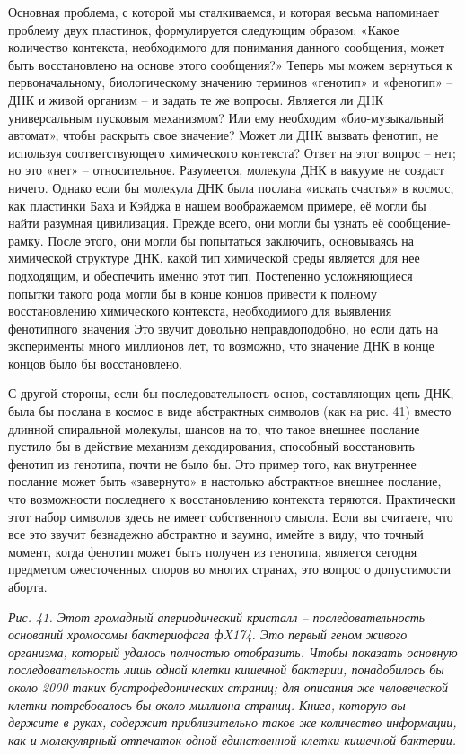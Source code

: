 \documentclass[../main.tex]{subfiles}
\begin{document}
Основная проблема, с которой мы сталкиваемся, и которая весьма напоминает проблему двух пластинок, формулируется следующим образом: «Какое количество контекста, необходимого для понимания данного сообщения, может быть восстановлено на основе этого сообщения?» Теперь мы можем вернуться к первоначальному, биологическому значению терминов «генотип» и «фенотип» \--- ДНК и живой организм \--- и задать те же вопросы. Является ли ДНК универсальным пусковым механизмом? Или ему необходим «био-музыкальный автомат», чтобы раскрыть свое значение? Может ли ДНК вызвать фенотип, не используя соответствующего химического контекста? Ответ на этот вопрос \--- нет; но это «нет» \--- относительное. Разумеется, молекула ДНК в вакууме не создаст ничего. Однако если бы молекула ДНК была послана «искать счастья» в космос, как пластинки Баха и Кэйджа в нашем воображаемом примере, её могли бы найти разумная цивилизация. Прежде всего, они могли бы узнать её сообщение-рамку. После этого, они могли бы попытаться заключить, основываясь на химической структуре ДНК, какой тип химической среды является для нее подходящим, и обеспечить именно этот тип. Постепенно усложняющиеся попытки такого рода могли бы в конце концов привести к полному восстановлению химического контекста, необходимого для выявления фенотипного значения \@ Это звучит довольно неправдоподобно, но если дать на эксперименты много миллионов лет, то возможно, что значение ДНК в конце концов было бы восстановлено.

С другой стороны, если бы последовательность основ, составляющих цепь ДНК, была бы послана в космос в виде абстрактных символов (как на рис. 41) вместо длинной спиральной молекулы, шансов на то, что такое внешнее послание пустило бы в действие механизм декодирования, способный восстановить фенотип из генотипа, почти не было бы. Это пример того, как внутреннее послание может быть «завернуто» в настолько абстрактное внешнее послание, что возможности последнего к восстановлению контекста теряются. Практически этот набор символов здесь не имеет собственного смысла. Если вы считаете, что все это звучит безнадежно абстрактно и заумно, имейте в виду, что точный момент, когда фенотип может быть получен из генотипа, является сегодня предметом ожесточенных споров во многих странах, это вопрос о допустимости аборта.

\emph{Рис. 41. Этот громадный апериодический кристалл \--- последовательность оснований хромосомы бактериофага фX174. Это первый геном живого организма, который удалось полностью отобразить. Чтобы показать основную последовательность лишь одной клетки кишечной бактерии, понадобилось бы около 2000 таких бустрофедонических страниц; для описания же человеческой клетки потребовалось бы около миллиона страниц. Книга, которую вы держите в руках, содержит приблизительно такое же количество информации, как и молекулярный отпечаток одной-единственной клетки кишечной бактерии.}
\end{document}
